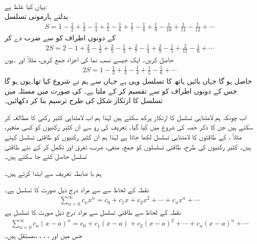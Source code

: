 یہاں کیا غلط ہے:\\
بدلتے ہارمونی تسلسل
\begin{align*}
S=1-\frac{1}{2}+\frac{1}{3}-\frac{1}{4}+\frac{1}{5}-\frac{1}{6}+\frac{1}{7}-\frac{1}{8}+\frac{1}{9}-\frac{1}{10}+\frac{1}{11}-\frac{1}{12}+\cdots
\end{align*}
کے دونوں اطراف کو  سے ضرب دے کر
\begin{align*}
2S=2-1+\frac{2}{3}-\frac{1}{2}+\frac{2}{5}-\frac{1}{3}+\frac{2}{7}-\frac{1}{4}+\frac{2}{9}-\frac{1}{5}+\frac{2}{11}-\frac{1}{6}+\cdots
\end{align*}
حاصل کریں۔ ایک جیسے نسب نما کی اجزاء جمع کریں، مثلاً  اور ۔یوں
\begin{align*}
2S=1-\frac{1}{2}+\frac{1}{3}-\frac{1}{4}+\frac{1}{5}-\frac{1}{6}+\cdots
\end{align*}
حاصل ہو گا جہاں بائیں ہاتھ کا تسلسل وہی ہے جہاں سے ہم نے شروع کیا تھا۔یوں  ہو گا جس کے دونوں اطراف کو  سے تقسیم کر کے  ملتا ہے۔
 کی صورت میں مسئلہ  میں تسلسل کا ارتکاز شکل  کی طرح ترسیم بنا کر دکھائیں۔

اب چونکہ ہم لامتناہی تسلسل کا ارتکاز پرکھ سکتے ہیں لہٰذا ہم اب لامتناہی کثیر رکنی کا مطالعہ کر سکتے ہیں جن کا ذکر حصہ  کی شروع میں کیا گیا۔ تعریف کی رو سے ان کثیر رکنیوں کو کسی متغیر، مثلاً ،  کے طاقتوں کا لامتناہی تسلسل لکھا جاتا ہے لہٰذا ہم ان کثیر رکنیوں کو طاقتی تسلسل کہتے ہیں۔ کثیر رکنیوں کی طرح، طاقتی تسلسلوں کو جمع، منفی، ضرب، تفرق اور تکمل کر کے نئے طاقتی تسلسل حاصل کئے جا سکتے ہیں۔

ہم با ضابطہ تعریف سے ابتدا کرتے ہیں۔

نقطہ  کے لحاظ سے  سے مراد درج ذیل صورت کا تسلسل ہے۔
\begin{align}\label{مساوات_تسلسل_تعریف_طاقتی_الف}
\sum_{n=0}^{\infty}c_nx^n=c_0+c_1x+c_2x^2+\cdots+c_nx^n+\cdots
\end{align}
نقطہ  کے لحاظ سے طاقتی تسلسل سے مراد درج ذیل صورت کا تسلسل ہے
\begin{align}\label{مساوات_تسلسل_تعریف_طاقتی_ب}
\sum_{n=0}^{\infty}c_n(x-a)^n=c_0+c_1(x-a)+c_2(x-a)^2+\cdots+c_n(x-a)^n+\cdots
\end{align}
جس میں   اور  ، ، ، ،، مستقل ہیں۔


